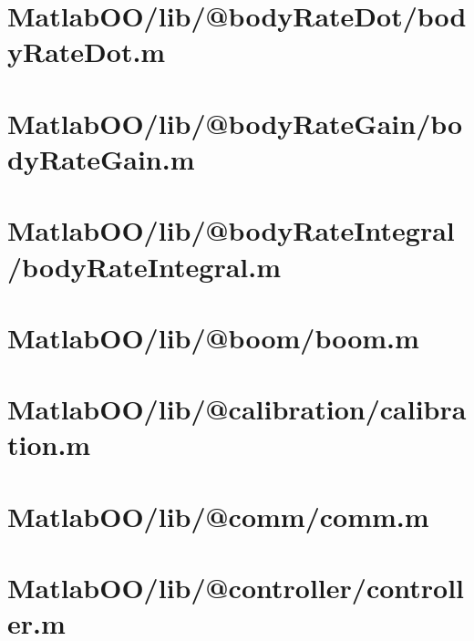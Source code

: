 \pagebreak
\section{MatlabOO/lib/@bodyRateDot/bodyRateDot.m}\label{code:MatlabOO/lib/@bodyRateDot/bodyRateDot.m}


\pagebreak
\section{MatlabOO/lib/@bodyRateGain/bodyRateGain.m}\label{code:MatlabOO/lib/@bodyRateGain/bodyRateGain.m}


\pagebreak
\section{MatlabOO/lib/@bodyRateIntegral/bodyRateIntegral.m}\label{code:MatlabOO/lib/@bodyRateIntegral/bodyRateIntegral.m}


\pagebreak
\section{MatlabOO/lib/@boom/boom.m}\label{code:MatlabOO/lib/@boom/boom.m}


\pagebreak
\section{MatlabOO/lib/@calibration/calibration.m}\label{code:MatlabOO/lib/@calibration/calibration.m}


\pagebreak
\section{MatlabOO/lib/@comm/comm.m}\label{code:MatlabOO/lib/@comm/comm.m}


\pagebreak
\section{MatlabOO/lib/@controller/controller.m}\label{code:MatlabOO/lib/@controller/controller.m}


